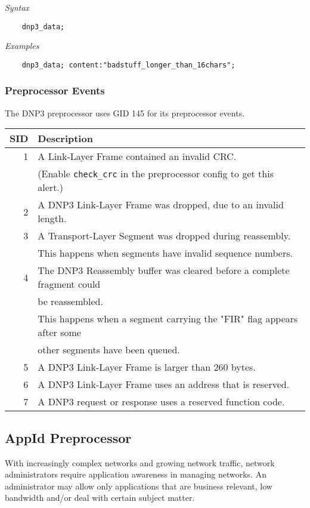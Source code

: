 \documentclass[english]{report}
\begin{document}
\textit{Syntax}
\footnotesize
\begin{verbatim}
    dnp3_data;
\end{verbatim}
\normalsize

\textit{Examples}
\footnotesize
\begin{verbatim}
    dnp3_data; content:"badstuff_longer_than_16chars";
\end{verbatim}
\normalsize

\subsubsection{Preprocessor Events}
The DNP3 preprocessor uses GID 145 for its preprocessor events.
\begin{longtable}{|r|p{13.5cm}|}

\hline
SID & Description\\
\hline
 1  & A Link-Layer Frame contained an invalid CRC. \\
    & (Enable \texttt{check\_crc} in the preprocessor config to get this alert.) \\
\hline
 2  & A DNP3 Link-Layer Frame was dropped, due to an invalid length. \\
\hline
 3  & A Transport-Layer Segment was dropped during reassembly. \\
    & This happens when segments have invalid sequence numbers. \\
\hline
 4  & The DNP3 Reassembly buffer was cleared before a complete fragment could \\
    & be reassembled. \\
    & This happens when a segment carrying the "FIR" flag appears after some \\
    & other segments have been queued. \\
\hline
 5  & A DNP3 Link-Layer Frame is larger than 260 bytes. \\
\hline
 6  & A DNP3 Link-Layer Frame uses an address that is reserved. \\
\hline
 7  & A DNP3 request or response uses a reserved function code. \\
\hline
\end{longtable}


\subsection{AppId Preprocessor}
\label{sub:appid}
With increasingly complex networks and growing network traffic, network administrators
require application awareness in managing networks. An administrator may allow only
applications that are business relevant, low bandwidth and/or deal with certain
subject matter.
\end{document}
